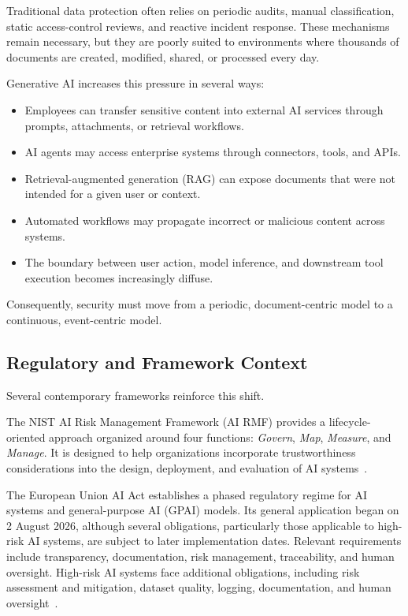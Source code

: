 \documentclass[conference]{IEEEtran}
\begin{document}
Traditional data protection often relies on periodic audits, manual classification, static access-control reviews, and reactive incident response. These mechanisms remain necessary, but they are poorly suited to environments where thousands of documents are created, modified, shared, or processed every day.

Generative AI increases this pressure in several ways:

\begin{itemize}
  \item Employees can transfer sensitive content into external AI services through prompts, attachments, or retrieval workflows.
  \item AI agents may access enterprise systems through connectors, tools, and APIs.
  \item Retrieval-augmented generation (RAG) can expose documents that were not intended for a given user or context.
  \item Automated workflows may propagate incorrect or malicious content across systems.
  \item The boundary between user action, model inference, and downstream tool execution becomes increasingly diffuse.
\end{itemize}

Consequently, security must move from a periodic, document-centric model to a continuous, event-centric model.

\subsection{Regulatory and Framework Context}

Several contemporary frameworks reinforce this shift.

The NIST AI Risk Management Framework (AI RMF) provides a lifecycle-oriented approach organized around four functions: \emph{Govern}, \emph{Map}, \emph{Measure}, and \emph{Manage}. It is designed to help organizations incorporate trustworthiness considerations into the design, deployment, and evaluation of AI systems~\cite{nist_airmf}.

The European Union AI Act establishes a phased regulatory regime for AI systems and general-purpose AI (GPAI) models. Its general application began on 2 August 2026, although several obligations, particularly those applicable to high-risk AI systems, are subject to later implementation dates. Relevant requirements include transparency, documentation, risk management, traceability, and human oversight. High-risk AI systems face additional obligations, including risk assessment and mitigation, dataset quality, logging, documentation, and human oversight~\cite{eu_ai_act,eu_ai_act_timeline}.
\end{document}
